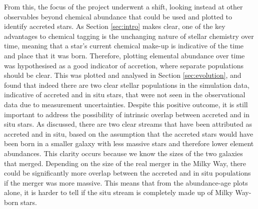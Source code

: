 \documentclass[fleqn,usenatbib]{mnras}
\begin{document}
From this, the focus of the project underwent a shift, looking instead at other observables beyond chemical abundance that could be used and plotted to identify accreted stars. As Section \ref{sec:intro} makes clear, one of the key advantages to chemical tagging is the unchanging nature of stellar chemistry over time, meaning that a star's current chemical make-up is indicative of the time and place that it was born. Therefore, plotting elemental abundance over time was hypothesised as a good indicator of accretion, where separate populations should be clear. This was plotted and analysed in Section \ref{sec:evolution}, and found that indeed there are two clear stellar populations in the simulation data, indicative of accreted and in situ stars, that were not seen in the observational data due to measurement uncertainties.  
Despite this positive outcome, it is still important to address the possibility of intrinsic overlap between accreted and in situ stars. As discussed, there are two clear streams that have been attributed as accreted and in situ, based on the assumption that the accreted stars would have been born in a smaller galaxy with less massive stars and therefore lower element abundances. This clarity occurs because we know the sizes of the two galaxies that merged. Depending on the size of the real merger in the Milky Way, there could be significantly more overlap between the accreted and in situ populations if the merger was more massive. This means that from the abundance-age plots alone, it is harder to tell if the situ stream is completely made up of Milky Way-born stars. 
\end{document}
